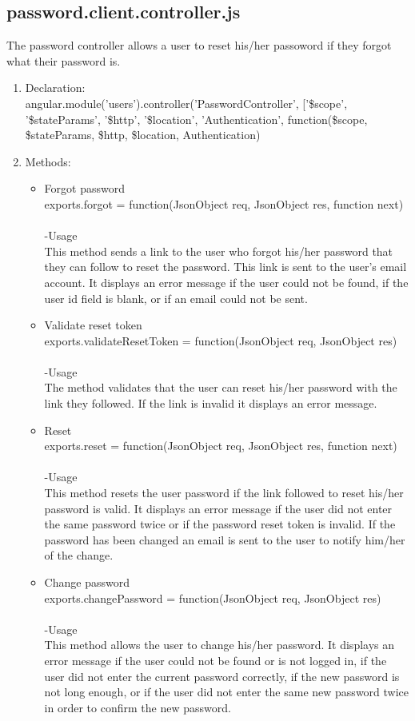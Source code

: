 \documentclass[a4paper,12pt]{article}
\begin{document}
 \subsection{password.client.controller.js}
 The password controller allows a user to reset his/her passoword if they forgot what their password is. 
 \begin{enumerate}
 \item Declaration:\\angular.module('users').controller('PasswordController', ['\$scope', '\$stateParams', '\$http', '\$location', 'Authentication',
	function(\$scope, \$stateParams, \$http, \$location, Authentication) 
	\item Methods:
	\begin{itemize}
	\item Forgot password\\ 
 exports.forgot = function(JsonObject req, JsonObject res, function next)\\ \\
 -Usage\\
 This method sends a link to the user who forgot his/her password that they can follow to reset the password. This link is sent to the user's email account. It displays an error message if the user could not be found, if the user id field is blank, or if an email could not be sent.
 \item Validate reset token\\
 exports.validateResetToken = function(JsonObject req, JsonObject res)\\ \\
 -Usage\\
 The method validates that the user can reset his/her password with the link they followed. If the link is invalid it displays an error message.\\
 \item Reset\\
 exports.reset = function(JsonObject req, JsonObject res, function next)\\ \\
 -Usage\\
 This method resets the user password if the link followed to reset his/her password is valid. It displays an error message if the user did not enter the same password twice or if the password reset token is invalid. If the password has been changed an email is sent to the user to notify him/her of the change.
 \item Change password\\
 exports.changePassword = function(JsonObject req, JsonObject res)\\  \\
 -Usage\\
 This method allows the user to change his/her password. It displays an error message if the user could not be found or is not logged in, if the user did not enter the current password correctly, if the new password is not long enough, or if the user did not enter the same new password twice in order to confirm the new password.
	\end{itemize}
 \end{enumerate}
\end{document}
